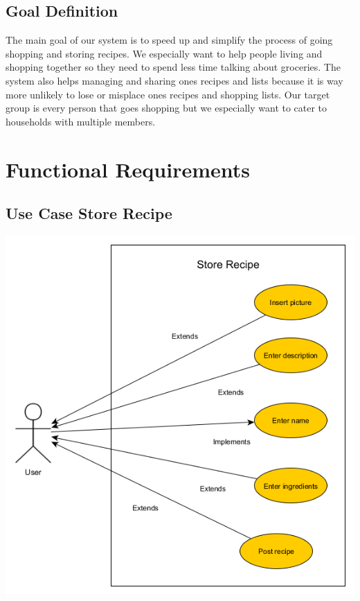 \documentclass[12pt]{article}
\theoremstyle{definition}
\begin{document}
\subsection{Goal Definition}

The main goal of our system is to speed up and simplify the process of going shopping and storing recipes. We especially want to help people living and shopping together so they need to spend less time talking about groceries. The system also helps managing and sharing ones recipes and lists because it is way more unlikely to lose or misplace ones recipes and shopping lists.
Our target group is every person that goes shopping but we especially want to cater to households with multiple members.

\pagebreak

\section{Functional Requirements}

\subsection{Use Case Store Recipe}

\includegraphics[scale=.5]{UseCaseStoreRecipe.png}\\
\end{document}
